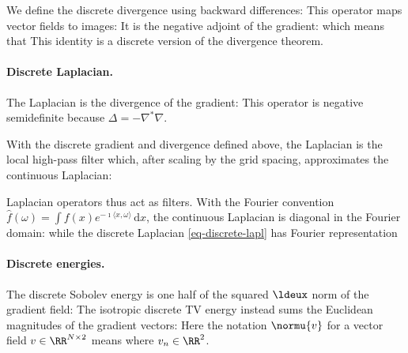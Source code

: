 We define the discrete divergence using backward differences:
This operator maps vector fields to images:
It is the negative adjoint of the gradient:
\eq{
	\diverg = - \nabla^*
}
which means that
This identity is a discrete version of the divergence theorem.


  
\paragraph{Discrete Laplacian.}

The Laplacian is the divergence of the gradient:
This operator is negative semidefinite because $\Delta=-\nabla^*\nabla$.

With the discrete gradient and divergence defined above, the Laplacian is the local high-pass filter
which, after scaling by the grid spacing, approximates the continuous Laplacian:

Laplacian operators thus act as filters. With the Fourier convention $\hat f(\omega)=\int f(x)e^{-\imath\langle x,\omega\rangle}\,\mathrm{d}x$, the continuous Laplacian is diagonal in the Fourier domain:
while the discrete Laplacian \eqref{eq-discrete-lapl} has Fourier representation

  
\paragraph{Discrete energies.}

The discrete Sobolev energy is one half of the squared $\ldeux$ norm of the gradient field:
The isotropic discrete TV energy instead sums the Euclidean magnitudes of the gradient vectors:
Here the notation $\normu{v}$ for a vector field $v \in \RR^{N \times 2}$ means
where $v_n \in \RR^2$.

